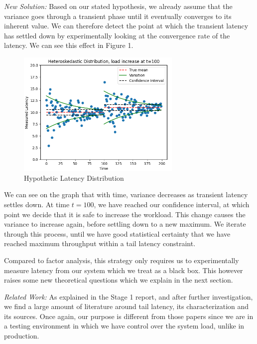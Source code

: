 \documentclass[12pt]{article}
\begin{document}
\noindent \textit{New Solution:} Based on our stated hypothesis, we already assume that the variance goes through a transient phase until it eventually converges to its inherent value. We can therefore detect the point at which the transient latency has settled down by experimentally looking at the convergence rate of the latency. We can see this effect in Figure 1.

\clearpage
\begin{figure}[H]
  \centering
  \includegraphics[width=0.7\textwidth]{distrib.png}
  \caption{Hypothetic Latency Distribution}
  \label{fig:sample}
\end{figure}

\noindent We can see on the graph that with time, variance decreases as transient latency settles down. At time $t=100$, we have reached our confidence interval, at which point we decide that it is safe to increase the workload. This change causes the variance to increase again, before settling down to a new maximum. We iterate through this process, until we have good statistical certainty that we have reached maximum throughput within a tail latency constraint. 

\noindent Compared to factor analysis, this strategy only requires us to experimentally measure latency from our system which we treat as a black box. This however raises some new theoretical questions which we explain in the next section.

\singlespacing

\noindent \textit{Related Work:} As explained in the Stage 1 report, and after further investigation, we find a large amount of literature around tail latency, its characterization and its sources. Once again, our purpose is different from those papers since we are in a testing environment in which we have control over the system load, unlike in production.
\end{document}
